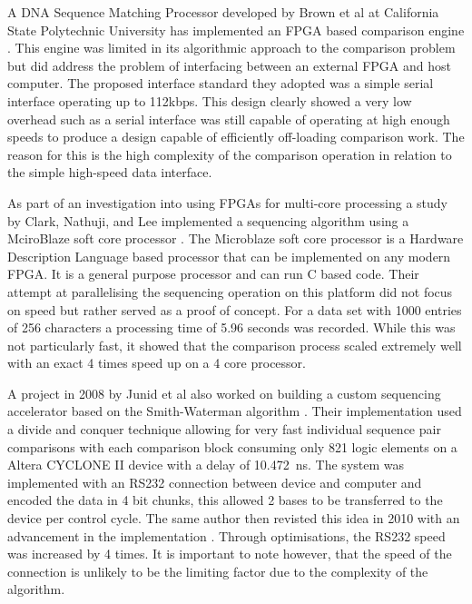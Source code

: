 A DNA Sequence Matching Processor developed by Brown et al at California State Polytechnic University has implemented an FPGA based comparison engine \cite{brown2004dna}. This engine was limited in its algorithmic approach to the comparison problem but did address the problem of interfacing between an external FPGA and host computer. The proposed interface standard they adopted was a simple serial interface operating up to 112kbps. This design clearly showed a very low overhead such as a serial interface was still capable of operating at high enough speeds to produce a design capable of efficiently off-loading comparison work. The reason for this is the high complexity of the comparison operation in relation to the simple high-speed data interface.


As part of an investigation into using FPGAs for multi-core processing a study by Clark, Nathuji, and Lee implemented a sequencing algorithm using a MciroBlaze soft core processor \cite{clark2005using}. The Microblaze soft core processor is a Hardware Description Language based processor that can be implemented on any modern FPGA. It is a general purpose processor and can run C based code. Their attempt at parallelising the sequencing operation on this platform did not focus on speed but rather served as a proof of concept. For a data set with 1000 entries of 256 characters a processing time of 5.96 seconds was recorded. While this was not particularly fast, it showed that the comparison process scaled extremely well with an exact 4 times speed up on a 4 core processor. 



A project in 2008 by Junid et al also worked on building a custom sequencing accelerator based on the Smith-Waterman algorithm \cite{5489221}.  Their implementation used a divide and conquer technique allowing for very fast individual sequence pair comparisons with each comparison block consuming only 821 logic elements on a Altera CYCLONE II device with a delay of 10.472~ns. The system was implemented with an RS232 connection between device and computer and encoded the data in 4 bit chunks, this allowed 2 bases to be transferred to the device per control cycle. The same author then revisted this idea in 2010 with an advancement in the implementation \cite{4786759}. Through optimisations, the RS232 speed was increased by 4 times. It is important to note however, that the speed of the connection is unlikely to be the limiting factor due to the complexity of the algorithm.


